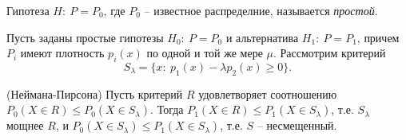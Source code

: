 \begin{definition}
    Гипотеза $\displaystyle H:\ P=P_{0}$, где $\displaystyle P_{0}$ -- известное распределние, называется \textit{простой}.
\end{definition}
Пусть заданы простые гипотезы $\displaystyle H_{0} :\ P=P_{0}$ и альтернатива $\displaystyle H_{1} :\ P=P_{1}$, причем $\displaystyle P_{i}$ имеют плотность $\displaystyle p_{i}( x)$ по одной и той же мере $\displaystyle \mu $. Рассмотрим критерий
\begin{equation*}
    S_{\lambda } =\{x:\ p_{1}( x) -\lambda p_{2}( x) \geqslant 0\} .
\end{equation*}
\begin{lemma}
    (Неймана-Пирсона) Пусть критерий $\displaystyle R$ удовлетворяет соотношению $\displaystyle P_{0}( X\in R) \leqslant P_{0}( X\in S_{\lambda })$. Тогда $\displaystyle P_{1}( X\in R) \leqslant P_{1}( X\in S_{\lambda })$, т.е. $\displaystyle S_{\lambda }$ мощнее $\displaystyle R$, и $\displaystyle P_{0}( X\in S_{\lambda }) \leqslant P_{1}( X\in S_{\lambda })$, т.е. $\displaystyle S$ -- несмещенный.
\end{lemma}
